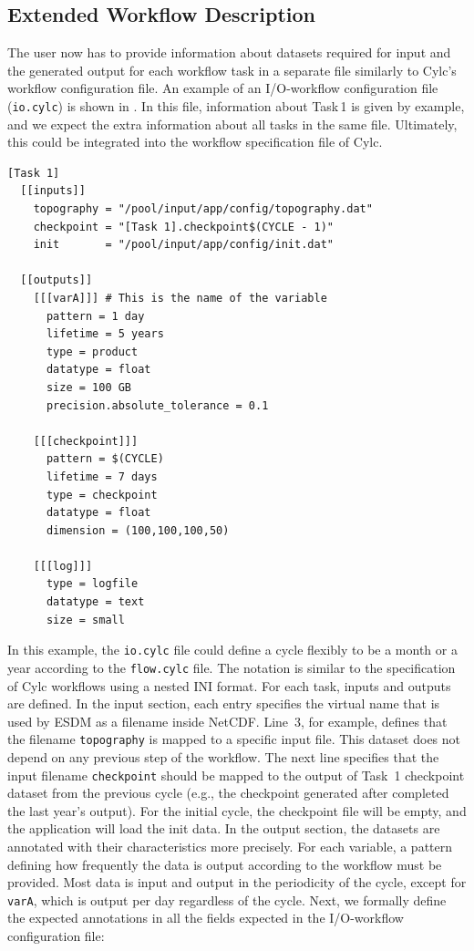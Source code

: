 \documentclass{superfri}
\begin{document}
\subsection{Extended Workflow Description}

The user now has to provide information about datasets required for input and the generated output for each workflow task in a separate file similarly to Cylc's workflow configuration file.
An example of an I/O-workflow configuration file (\texttt{io.cylc}) is shown in . In this file, information about Task\,1 is given by example, and we expect the extra information about all tasks in the same file. Ultimately, this could be integrated into the workflow specification file of Cylc.

\begin{lstlisting}[caption = External Cylc I/O-workflow configuration file (\texttt{io.cylc}), label=lst:cylc]
[Task 1]
  [[inputs]]
    topography = "/pool/input/app/config/topography.dat"
    checkpoint = "[Task 1].checkpoint$(CYCLE - 1)"
    init       = "/pool/input/app/config/init.dat"

  [[outputs]]
    [[[varA]]] # This is the name of the variable
      pattern = 1 day
      lifetime = 5 years
      type = product
      datatype = float
      size = 100 GB
      precision.absolute_tolerance = 0.1

    [[[checkpoint]]]
      pattern = $(CYCLE)
      lifetime = 7 days
      type = checkpoint
      datatype = float
      dimension = (100,100,100,50)

    [[[log]]]
      type = logfile
      datatype = text
      size = small
\end{lstlisting}

In this example, the \texttt{io.cylc} file could define a cycle flexibly to be a month or a year according to the \texttt{flow.cylc} file.
The notation is similar to the specification of Cylc workflows using a nested INI format.
For each task, inputs and outputs are defined.
In the input section, each entry specifies the virtual name that is used by ESDM as a filename inside NetCDF.
Line~3, for example, defines that the filename \texttt{topography} is mapped to a specific input file.
This dataset does not depend on any previous step of the workflow.
The next line specifies that the input filename \texttt{checkpoint} should be mapped to the output of Task~1 checkpoint dataset from the previous cycle (e.g., the checkpoint generated after completed the last year's output).
For the initial cycle, the checkpoint file will be empty, and the application will load the init data.
In the output section, the datasets are annotated with their characteristics more precisely.
For each variable, a pattern defining how frequently the data is output according to the workflow must be provided.
Most data is input and output in the periodicity of the cycle, except for \texttt{varA}, which is output per day regardless of the cycle.
Next, we formally define the expected annotations in all the fields expected in the I/O-workflow configuration file:
\end{document}

